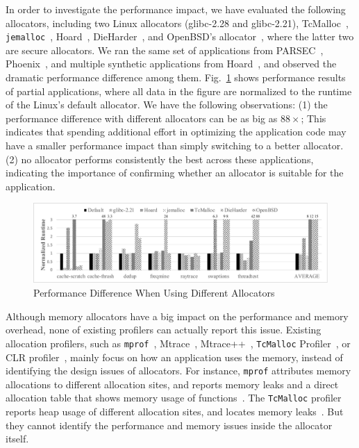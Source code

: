 In order to investigate the performance impact, we have evaluated the following allocators, including two Linux allocators (glibc-2.28 and glibc-2.21), TcMalloc~\citep{tcmalloc}, \texttt{jemalloc}~\citep{jemalloc}, Hoard~\citep{Hoard}, DieHarder~\citep{DieHarder}, and OpenBSD's allocator~\citep{openbsd}, where the latter two are secure allocators. We ran the same set of applications from PARSEC~\citep{parsec},  Phoenix~\citep{phoenix}, and multiple synthetic applications from Hoard~\cite{Hoard}, and observed the dramatic performance difference among them. Fig.~\ref{fig:motivation} shows performance results of partial applications, where all data in the figure are normalized to the runtime of the Linux's default allocator. We have the following observations: (1) the performance difference with different allocators can be as big as $88\times$; This indicates that spending additional effort in optimizing the application code may have a smaller performance impact than simply switching to a better allocator. (2) no allocator performs consistently the best across these applications, indicating the importance of confirming whether an allocator is suitable for the application. 



\begin{figure}[!ht]
\centering
\includegraphics[width=5in]{figures/regular-performance}
\caption{Performance Difference When Using Different Allocators\label{fig:motivation}}
\end{figure}


Although memory allocators have a big impact on the performance and memory overhead, none of existing profilers can actually report this issue. Existing allocation profilers, such as \texttt{mprof}~\citep{Zorn:1988:MAP:894814}, Mtrace~\citep{mtrace}, Mtrace++~\citep{Lee:2000:DMM:786772.787150}, \texttt{TcMalloc} Profiler~\citep{tcmalloc-profiler}, or CLR profiler~\citep{lupasc2014dynamic}, mainly focus on how an application uses the memory, instead of identifying the design issues of allocators. For instance, \texttt{mprof} attributes memory allocations to different allocation sites, and reports memory leaks and a direct allocation table that shows memory usage of functions~\citep{Zorn:1988:MAP:894814}. The \texttt{TcMalloc} profiler reports heap usage of different allocation sites, and locates memory leaks~\citep{tcmalloc-profiler}. But they cannot identify the performance and memory issues inside the allocator itself. 

